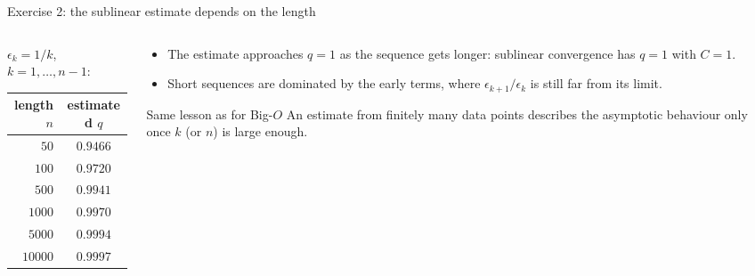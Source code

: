 \documentclass[aspectratio=169]{beamer}
\begin{document}
\begin{frame}{Exercise 2: the sublinear estimate depends on the length}
\begin{columns}[T]
\begin{column}{0.45\textwidth}
\centering
\small
$\epsilon_k = 1/k$, \ $k = 1, \ldots, n-1$:\\[4pt]
\begin{tabular}{rc}
\toprule
length $n$ & estimated $q$ \\
\midrule
$50$ & $0.9466$ \\
$100$ & $0.9720$ \\
$500$ & $0.9941$ \\
$1000$ & $0.9970$ \\
$5000$ & $0.9994$ \\
$10000$ & $0.9997$ \\
\bottomrule
\end{tabular}
\end{column}
\begin{column}{0.52\textwidth}
\small
\begin{itemize}
  \item The estimate approaches $q = 1$ as the sequence gets longer: sublinear convergence has $q = 1$ with $C = 1$.
  \item Short sequences are dominated by the early terms, where $\epsilon_{k+1}/\epsilon_k$ is still far from its limit.
\end{itemize}
\begin{exampleblock}{Same lesson as for Big-$O$}
\scriptsize An estimate from finitely many data points describes the asymptotic behaviour only once $k$ (or $n$) is large enough.
\end{exampleblock}
\end{column}
\end{columns}
\end{frame}
\end{document}
